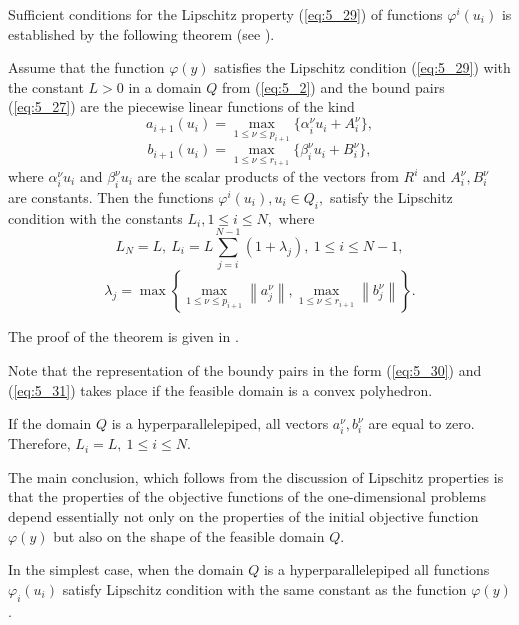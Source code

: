 Sufficient conditions for the Lipschitz property (\ref{eq:5_29})  of functions $\varphi^i(u_i)$  is established by the following theorem (see \cite{5_StrMonRus}).
\begin{theorem}
\label{theor:5_1}
Assume that the function $\varphi(y)$ satisfies the Lipschitz condition (\ref{eq:5_29})  with the constant $L>0$ in a domain $Q$ from (\ref{eq:5_2}) and the bound pairs (\ref{eq:5_27}) are the piecewise linear functions of the kind 
\begin{equation}
\label{eq:5_30}
a_{i+1}(u_i)=\max_{1\leq\nu \leq p_{i+1}}\{\alpha_i^\nu u_i+A_i^\nu\},
\end{equation}
\begin{equation}
\label{eq:5_31}
b_{i+1}(u_i)=\max_{1\leq\nu \leq r_{i+1}}\{\beta_i^\nu u_i+B_i^\nu\},
\end{equation}
where  $\alpha_i^\nu u_i$ and $\beta_i^\nu u_i$ are the scalar products of the vectors from $R^i$  and $A_i^\nu, B_i^\nu$ are constants. Then the functions $\varphi^i(u_i),u_i\in Q_i,$ satisfy the Lipschitz condition with the constants $L_i,1\leq i\leq N,$ 
where
\begin{displaymath}
L_N=L,\:L_i=L\sum_{j=i}^{N-1}{(1+\lambda_j)},\:1\leq i\leq N-1,
\end{displaymath}
\begin{displaymath}
\lambda_j=\max\left\{\max_{1\leq \nu\leq p_{i+1}}\left\|a_j^\nu\right\|,\max_{1\leq \nu\leq r_{i+1}}\left\|b_j^\nu\right\| \right\}.
\end{displaymath}
\end{theorem}

The proof of the theorem is given in \cite{5_StrMonRus}.

Note that the representation of the boundy pairs in the form (\ref{eq:5_30}) and (\ref{eq:5_31}) takes place if the feasible domain is a convex polyhedron. 

If the domain $Q$ is a hyperparallelepiped, all vectors $a_i^\nu,b_i^\nu$ are equal to zero. Therefore, $L_i=L,\:1\leq i\leq N$.

The main conclusion, which follows from the discussion of Lipschitz properties is that the properties of the objective functions of the one-dimensional problems depend essentially not only on the properties of the initial objective function $\varphi(y)$  but also on the shape of the feasible domain $Q$.

In the simplest case, when the domain $Q$ is a hyperparallelepiped all functions $\varphi_i(u_i)$  satisfy Lipschitz condition with the same constant as the function $\varphi(y)$.

